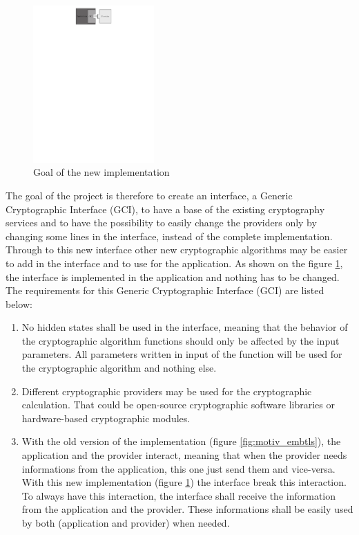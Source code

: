 \begin{figure}[!ht]
\centering
\includegraphics[trim=6cm 24.5cm 2cm 0cm, height=6cm]{figures/intro_gci.pdf}
\caption{Goal of the new implementation}
\label{fig:motiv_gci}
\end{figure}
The goal of the project is therefore to create an interface, a Generic
Cryptographic Interface (GCI), to have a base of the existing cryptography
services and to have the possibility to easily change the providers only by
changing some lines in the interface, instead of the complete
implementation.\newline
Through to this new interface other new cryptographic algorithms may be
easier to add in the interface and to use for the application.\newline
As shown on the figure \ref{fig:motiv_gci}, the interface is implemented in the
application and nothing has to be changed.
The requirements for this Generic Cryptographic Interface (GCI) are listed
below:
\begin{enumerate}
  \item No hidden states shall be used in the interface, meaning that the
  behavior of the cryptographic algorithm functions should only be affected by
  the input parameters.
  All parameters written in input of the function will be used for the
  cryptographic algorithm and nothing else.
  \item Different cryptographic providers may be used for the cryptographic
  calculation. \newline
  That could be open-source cryptographic software libraries or hardware-based cryptographic modules.
  \item With the old version of the implementation (figure
  \ref{fig:motiv_embtls}), the application and the provider interact, meaning
  that when the provider needs informations from the application, this one just send them and
  vice-versa.
  With this new implementation (figure \ref{fig:motiv_gci}) the interface break
  this interaction. To always have this interaction, the interface shall receive
  the information from the application and the provider. These informations
  shall be easily used by both (application and provider) when needed.
\end{enumerate}
 
